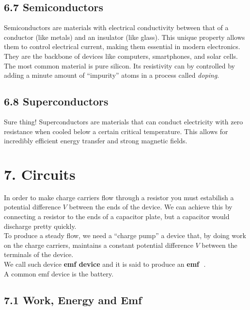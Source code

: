 \documentclass[12pt, a4paper]{article}
\newcommand{\calE}{{\!\!\text{\usefont{U}{calligra}{m}{n}E}\,\,}}
\begin{document}
		
		
		\subsection*{6.7 Semiconductors}
		
		Semiconductors are materials with electrical conductivity between that of a conductor (like metals) and an insulator (like glass). This unique property allows them to control electrical current, making them essential in modern electronics. They are the backbone of devices like computers, smartphones, and solar cells.
		The most common material is pure silicon. Its resistivity can by controlled by adding a minute amount of ``impurity'' atoms in a process called \textit{doping}.
		
		\subsection*{6.8 Superconductors}
		
		Sure thing! Superconductors are materials that can conduct electricity with zero resistance when cooled below a certain critical temperature. This allows for incredibly efficient energy transfer and strong magnetic fields.
		
		
		
		
		\newpage
		
		\section*{7. Circuits}
		
		In order to make charge carriers flow through a resistor you must estabilish a potential difference $V$ between the ends of the device. We can achieve this by connecting a resistor to the ends of a capacitor plate, but a capacitor would discharge pretty quickly. \\
		To produce a steady flow, we need a ``charge pump'' a device that, by doing work on the charge carriers, maintains a constant potential difference $V$ between the terminals of the device. 
		\\ We call such device \textbf{emf device} and it is said to produce an \textbf{emf} \textbf{\calE}. \\
		A common emf device is the battery.
		
		
		
		\subsection*{7.1 Work, Energy and Emf}
		
\end{document}
